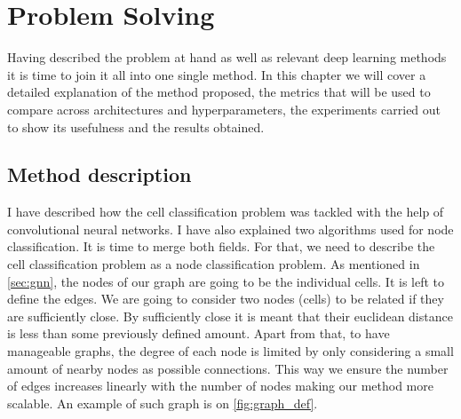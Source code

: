 \chapter{Problem Solving}

Having described the problem at hand as well as relevant deep learning methods it is time to join it all into one single method. In this chapter we will cover a detailed explanation of the method proposed, the metrics that will be used to compare across architectures and hyperparameters, the experiments carried out to show its usefulness and the results obtained.

\section{Method description}\label{sec:descr}

I have described how the cell classification problem was tackled with the help of convolutional neural networks. I have also explained two algorithms used for node classification. It is time to merge both fields. For that, we need to describe the cell classification problem as a node classification problem. As mentioned in \autoref{sec:gnn}, the nodes of our graph are going to be the individual cells. It is left to define the edges. We are going to consider two nodes (cells) to be related if they are sufficiently close. By sufficiently close it is meant that their euclidean distance is less than some previously defined amount. Apart from that, to have manageable graphs, the degree of each node is limited by only considering a small amount of nearby nodes as possible connections. This way we ensure the number of edges increases linearly with the number of nodes making our method more scalable. An example of such graph is on \autoref{fig:graph_def}. 

